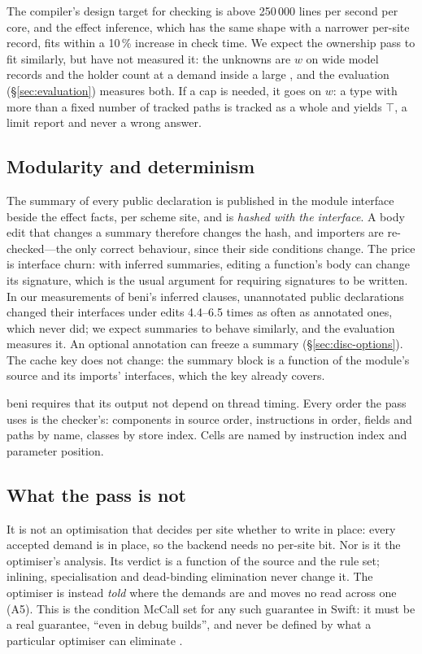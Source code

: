 The compiler's design target for checking is above 250\,000 lines per second per core, and the effect
inference, which has the same shape with a narrower per-site record, fits within a 10\,\% increase in
check time. We expect the ownership pass to fit similarly, but have not measured it: the unknowns are
$w$ on wide model records and the holder count at a demand inside a large , and the
evaluation (\S\ref{sec:evaluation}) measures both. If a cap is needed, it goes on $w$: a type with
more than a fixed number of tracked paths is tracked as a whole and yields $\top$, a limit report and
never a wrong answer.

\subsection{Modularity and determinism}
\label{sec:inf-modular}

The summary of every public declaration is published in the module interface beside the effect
facts, per scheme site, and is \emph{hashed with the interface}. A body edit that changes a summary
therefore changes the hash, and importers are re-checked---the only correct behaviour, since their
side conditions change. The price is interface churn: with inferred summaries, editing a function's body can change its
signature, which is the usual argument for requiring signatures to be written. In our measurements of beni's inferred  clauses, unannotated
public declarations changed their interfaces under edits 4.4--6.5 times as often as annotated ones,
which never did; we expect summaries to behave similarly, and the evaluation measures it. An optional
annotation can freeze a summary (\S\ref{sec:disc-options}). The cache key does not change: the
summary block is a function of the module's source and its imports' interfaces, which the key already
covers.

beni requires that its output not depend on thread timing. Every order the pass uses is the
checker's: components in source order, instructions in order, fields and paths by name, classes by
store index. Cells are named by instruction index and parameter position.

\subsection{What the pass is not}
\label{sec:inf-not}

It is not an optimisation that decides per site whether to write in place: every accepted demand is
in place, so the backend needs no per-site bit. Nor is it the optimiser's analysis. Its verdict is a
function of the source and the rule set; inlining, specialisation and dead-binding elimination never
change it. The optimiser is instead \emph{told} where the demands are and moves no read across one
(A5). This is the condition McCall set for any such guarantee in Swift: it must be a real guarantee,
``even in debug builds'', and never be defined by what a particular optimiser can eliminate
\citep{swift2025explicitcopies}.
